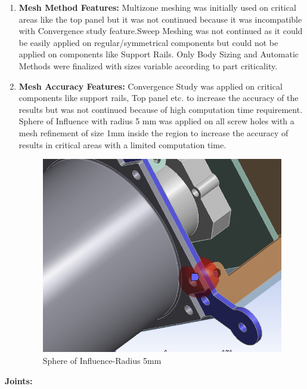 \documentclass[../../main.tex]{subfiles}
\begin{document}
    \begin{enumerate}
        \item \textbf{Mesh Method Features: }Multizone meshing was initially used on critical areas like the top panel but it was not continued because it was incompatible with Convergence study feature.Sweep Meshing was not continued as it could be easily applied on regular/symmetrical components but could not be applied on components like Support Rails. Only Body Sizing and Automatic Methods were finalized with sizes variable according to part criticality.
        \item \textbf{Mesh Accuracy Features: }Convergence Study was applied on critical components like support rails, Top panel etc. to increase the accuracy of the results but was not continued because of high computation time requirement. Sphere of Influence with radius 5 mm was applied on all screw holes with a mesh refinement of size 1mm inside the region to increase the accuracy of results in critical areas with a limited computation time.
        \begin{figure}[H]
        \centering
        \includegraphics[scale=0.5]{Figures/Mechanical/spoi.PNG}
        \caption{Sphere of Influence-Radius 5mm}
        \label{fig:sys_CAD}
    \end{figure}
    \end{enumerate}
    \item \textbf{Joints: }
\end{document}
